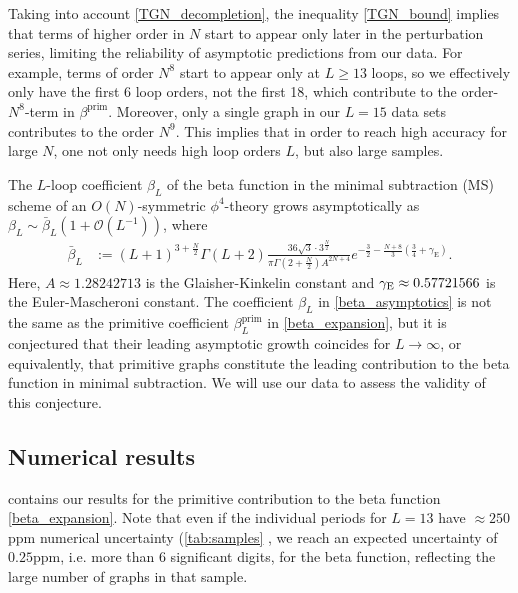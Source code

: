 \documentclass[11pt,a4paper]{article}
\renewcommand{\|}{\rule[-0.4ex]{0.2ex}{1.2em}}
\begin{document}
Taking into account \cref{TGN_decompletion}, the inequality \cref{TGN_bound} implies that terms of higher order in $N$ start to appear only later in the perturbation series, limiting the reliability of asymptotic predictions from our data. 
For example, terms of order $N^8$ start to appear only at $L\geq 13$ loops, so we effectively only have the first 6 loop orders, not the first 18, which contribute to the order-$N^8$-term in $\beta^\text{prim}$. Moreover, only a single graph in our $L=15$ data sets contributes to the order $N^9$. This implies that in order to reach high accuracy for large $N$, one not only needs high loop orders $L$, but also large samples.



The $L$-loop coefficient $\beta_L$ of the beta function in the minimal subtraction (MS) scheme of an $O(N)$-symmetric $\phi^4$-theory grows asymptotically as $\beta_L \sim \bar \beta_L \left( 1+ \mathcal{O}\left( L^{-1} \right)   \right)  $, where \cite{mckane_nonperturbative_1984,mckane_perturbation_2019}
\begin{align}\label{beta_asymptotics}
	 \bar \beta_L &:=(L+1)^{3+\frac{N}{2}}\Gamma(L+2) \frac{36 \sqrt 3\cdot 3^{ \frac{N}{2}}  }{\pi   \Gamma \left( 2+\frac{N}{2} \right) A^{2N+4} } e^{-\frac 32 - \frac{N+8}{3}\left( \frac 3 4 + \gamma_\text{E} \right)   }    .
\end{align}
Here, $A\approx 1.28242713$ is the Glaisher-Kinkelin constant \cite{kinkelin_ueber_1860} and $\gamma_\text E\approx 0.57721566$ is the Euler-Mascheroni constant. 
The  coefficient $\beta_L$ in \cref{beta_asymptotics} is not the same as the primitive coefficient $\beta^\text{prim}_L$ in \cref{beta_expansion}, but it is conjectured \cite{mckane_perturbation_2019} that their leading asymptotic growth coincides for $L\rightarrow\infty$, or equivalently, that primitive graphs constitute the leading contribution to the beta function in minimal subtraction. We will use our data to assess the validity of this conjecture.



 

\subsection{Numerical results}\label{sec:beta_numerical}



 contains our results for the primitive contribution to the beta function \cref{beta_expansion}. Note that even if the individual periods  for $L=13$ have $\approx 250$ppm numerical uncertainty (\cref{tab:samples} ,  we reach an expected uncertainty of $0.25$ppm, i.e. more than 6 significant digits, for the beta function, reflecting the large number of graphs in that sample.
\end{document}
